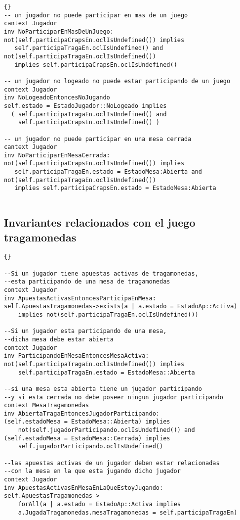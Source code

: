 \begin{framed}
\begin{lstlisting}[frame=trbl]{}
-- un jugador no puede participar en mas de un juego
cantext Jugador
inv NoParticiparEnMasDeUnJuego:
not(self.participaCrapsEn.oclIsUndefined()) implies 
   self.participaTragaEn.oclIsUndefined() and
not(self.participaTragaEn.oclIsUndefined()) 
   implies self.participaCrapsEn.oclIsUndefined()

-- un jugador no logeado no puede estar participando de un juego
context Jugador
inv NoLogeadoEntoncesNoJugando
self.estado = EstadoJugador::NoLogeado implies 
  ( self.participaTragaEn.oclIsUndefined() and 
    self.participaCrapsEn.oclIsUndefined() )

-- un jugador no puede participar en una mesa cerrada
cantext Jugador
inv NoParticiparEnMesaCerrada:
not(self.participaCrapsEn.oclIsUndefined()) implies 
   self.participaTragaEn.estado = EstadoMesa:Abierta and
not(self.participaTragaEn.oclIsUndefined()) 
   implies self.participaCrapsEn.estado = EstadoMesa:Abierta
   
\end{lstlisting}


\subsection{Invariantes relacionados con el juego tragamonedas}
\lstset{language=ocl}
\lstset{commentstyle=\textit}
\begin{lstlisting}[frame=trbl]{}

--Si un jugador tiene apuestas activas de tragamonedas,
--esta participando de una mesa de tragamonedas
context Jugador
inv ApuestasActivasEntoncesParticipaEnMesa:
self.ApuestasTragamonedas->exists(a | a.estado = EstadoAp::Activa)
    implies not(self.participaTragaEn.oclIsUndefined())

--Si un jugador esta participando de una mesa, 
--dicha mesa debe estar abierta
context Jugador
inv ParticipandoEnMesaEntoncesMesaActiva:
not(self.participaTragaEn.oclIsUndefined()) implies
    self.participaTragaEn.estado = EstadoMesa::Abierta

--si una mesa esta abierta tiene un jugador participando 
--y si esta cerrada no debe poseer ningun jugador participando
context MesaTragamonedas
inv AbiertaTragaEntoncesJugadorParticipando:
(self.estadoMesa = EstadoMesa::Abierta) implies 
    not(self.jugadorParticipando.oclIsUndefined()) and
(self.estadoMesa = EstadoMesa::Cerrada) implies 
    self.jugadorParticipando.oclIsUndefined()

--las apuestas activas de un jugador deben estar relacionadas 
--con la mesa en la que esta jugando dicho jugador
context Jugador
inv ApuestasActivasEnMesaEnLaQueEstoyJugando:
self.ApuestasTragamonedas->
    forAll(a | a.estado = EstadoAp::Activa implies 
    a.JugadaTragamonedas.mesaTragamonedas = self.participaTragaEn)


\end{lstlisting}
\end{framed}
